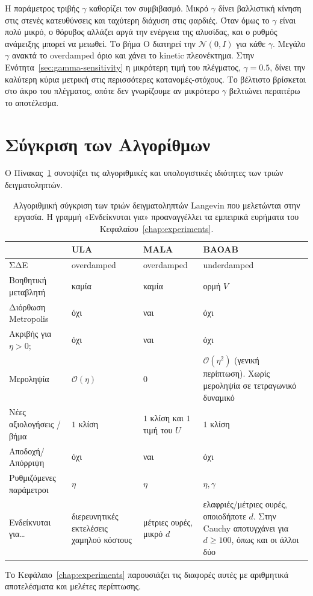 Η παράμετρος τριβής $\gamma$ καθορίζει τον συμβιβασμό. Μικρό $\gamma$ δίνει βαλλιστική
κίνηση στις στενές κατευθύνσεις και ταχύτερη διάχυση στις φαρδιές. Όταν όμως το
$\gamma$ είναι πολύ μικρό, ο θόρυβος αλλάζει αργά την ενέργεια της αλυσίδας, και ο
ρυθμός ανάμειξης μπορεί να μειωθεί. Το βήμα O διατηρεί
την $\mathcal{N}(0,I)$ για κάθε $\gamma$. Μεγάλο $\gamma$ ανακτά
το overdamped όριο και χάνει το kinetic πλεονέκτημα. Στην
Ενότητα~\ref{sec:gamma-sensitivity} η μικρότερη τιμή του πλέγματος, $\gamma=0.5$,
δίνει την καλύτερη κύρια μετρική στις περισσότερες κατανομές-στόχους. Το βέλτιστο
βρίσκεται στο άκρο του πλέγματος, οπότε δεν γνωρίζουμε αν μικρότερο $\gamma$
βελτιώνει περαιτέρω το αποτέλεσμα.

\section{Σύγκριση των Αλγορίθμων}
\label{sec:alg-summary}

Ο Πίνακας~\ref{tab:alg-summary} συνοψίζει τις αλγοριθμικές και υπολογιστικές
ιδιότητες των τριών δειγματοληπτών.

\begin{table}[H]
\centering
\small
\renewcommand{\arraystretch}{1.15}
\begin{tabular}{@{}p{}>{\raggedright\arraybackslash}p{}>{\raggedright\arraybackslash}p{}>{\raggedright\arraybackslash}p{}@{}}
\toprule
                                  & ULA      & MALA              & BAOAB                  \\
\midrule
ΣΔΕ                               & overdamped & overdamped       & underdamped            \\
Βοηθητική μεταβλητή              & καμία    & καμία             & ορμή $V$               \\
Διόρθωση Metropolis               & όχι      & ναι               & όχι                    \\
Ακριβής για $\eta > 0$;           & όχι      & ναι               & όχι                    \\
Μεροληψία        & $\mathcal{O}(\eta)$ & $0$    & $\mathcal{O}(\eta^2)$ (γενική περίπτωση). Χωρίς μεροληψία σε τετραγωνικό δυναμικό \\
Νέες αξιολογήσεις / βήμα        & $1$ κλίση & $1$ κλίση και $1$ τιμή του $U$ & $1$ κλίση \\
Αποδοχή/Απόρριψη                  & όχι      & ναι               & όχι                    \\
Ρυθμιζόμενες παράμετροι          & $\eta$   & $\eta$            & $\eta, \gamma$         \\
Ενδείκνυται για\ldots            & διερευνητικές εκτελέσεις χαμηλού κόστους & μέτριες ουρές, μικρό $d$ & ελαφριές/μέτριες ουρές, οποιοδήποτε $d$. Στην Cauchy αποτυγχάνει για $d \ge 100$, όπως και οι άλλοι δύο \\
\bottomrule
\end{tabular}
\caption{Αλγοριθμική σύγκριση των τριών δειγματοληπτών Langevin που μελετώνται
στην εργασία. Η γραμμή «Ενδείκνυται για» προαναγγέλλει τα εμπειρικά
ευρήματα του Κεφαλαίου~\ref{chap:experiments}.}
\label{tab:alg-summary}
\end{table}

Το Κεφάλαιο~\ref{chap:experiments} παρουσιάζει τις διαφορές αυτές με αριθμητικά
αποτελέσματα και μελέτες περίπτωσης.
